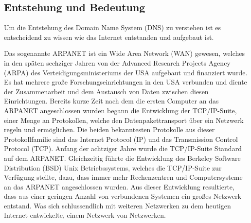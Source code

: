 \documentclass[a4paper, 12pt, BCOR10mm, DIV12, toc=bibliography, toc=listof, german]{scrbook}
\def \dns {Domain Name System (DNS)}
\begin{document}
			\subsection{Entstehung und Bedeutung} %
			\label{sub:entstehung}

			Um die Entstehung des \dns{} zu verstehen ist es entscheidend zu wissen wie das Internet
			entstanden und aufgebaut ist.
			
			Das sogenannte ARPANET ist ein Wide Area Network (WAN) gewesen, welches in den späten
			sechziger Jahren von der Advanced Research Projects Agency (ARPA) des
			Verteidigungsministeriums der USA aufgebaut und finanziert wurde. Es hat mehrere große
			Forschungseinrichtungen in den USA verbunden und diente der Zusammenarbeit und dem Austausch
			von Daten zwischen diesen Einrichtungen. Bereits kurze Zeit nach dem die ersten Computer an
			das ARPANET angeschlossen wurden begann die Entwicklung der TCP/IP-Suite, einer Menge an
			Protokollen, welche den Datenpakettransport über ein Netzwerk regeln und ermöglichen.  Die
			beiden bekanntesten Protokolle aus dieser Protokollfamilie sind das Internet Protocol (IP) und
			das Transmission Control Protocol (TCP). Anfang der achtziger Jahre wurde die TCP/IP-Suite
			Standard auf dem ARPANET. Gleichzeitig führte die Entwicklung des Berkeley Software
			Distribution (BSD) Unix Betriebssystems, welches die TCP/IP-Suite zur Verfügung stellte, dazu,
			dass immer mehr Rechenzentren und Computersysteme an das ARPANET angeschlossen wurden. Aus
			dieser Entwicklung resultierte, dass aus einer geringen Anzahl von verbundenen Systemen ein
			großes Netzwerk entstand. Was sich schlussendlich mit weiteren Netzwerken zu dem heutigen
			Internet entwickelte, einem Netzwerk von Netzwerken.
\end{document}
